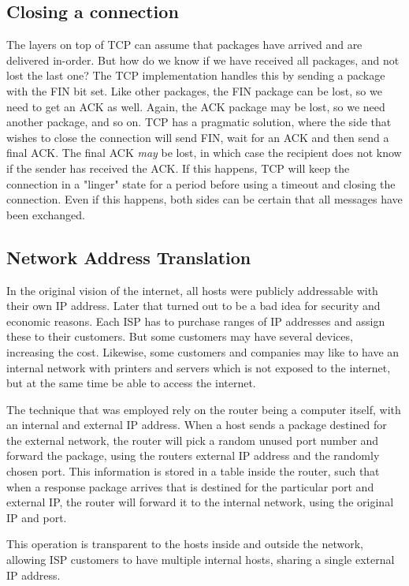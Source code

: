 \subsection{Closing a connection}
The layers on top of TCP can assume that packages have arrived and are delivered in-order. But how do we know if we have received all packages, and not lost the last one? The TCP implementation handles this by sending a package with the FIN bit set. Like other packages, the FIN package can be lost, so we need to get an ACK as well. Again, the ACK package may be lost, so we need another package, and so on. TCP has a pragmatic solution, where the side that wishes to close the connection will send FIN, wait for an ACK and then send a final ACK. The final ACK \emph{may} be lost, in which case the recipient does not know if the sender has received the ACK. If this happens, TCP will keep the connection in a "linger" state for a period before using a timeout and closing the connection. Even if this happens, both sides can be certain that all messages have been exchanged.

\subsection{Network Address Translation}
In the original vision of the internet, all hosts were publicly addressable with their own IP address. Later that turned out to be a bad idea for security and economic reasons. Each ISP has to purchase ranges of IP addresses and assign these to their customers. But some customers may have several devices, increasing the cost. Likewise, some customers and companies may like to have an internal network with printers and servers which is not exposed to the internet, but at the same time be able to access the internet.

The technique that was employed rely on the router being a computer itself, with an internal and external IP address. When a host sends a package destined for the external network, the router will pick a random unused port number and forward the package, using the routers external IP address and the randomly chosen port. This information is stored in a table inside the router, such that when a response package arrives that is destined for the particular port and external IP, the router will forward it to the internal network, using the original IP and port. 

This operation is transparent to the hosts inside and outside the network, allowing ISP customers to have multiple internal hosts, sharing a single external IP address. 

